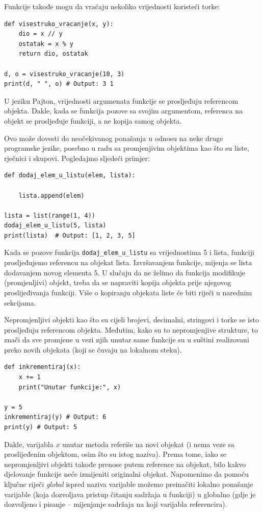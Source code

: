 Funkcije takođe mogu da vraćaju nekoliko vrijednosti koristeći torke:

\begin{verbatim}
def visestruko_vracanje(x, y):
    dio = x // y
    ostatak = x % y
    return dio, ostatak

d, o = visestruko_vracanje(10, 3)
print(d, " ", o) # Output: 3 1
\end{verbatim}


U jeziku Pajton, vrijednosti argumenata funkcije se prosljeđuju refere\-ncom objekta. Dakle, kada se funkcija pozove sa svojim argume\-ntom, referenca na objekt se prosljeđuje funkciji, a ne kopija samog objekta. %

Ovo može dovesti do   neočekivanog ponašanja u odnosu na neke druge programske jezike, posebno u radu sa promjenjivim objektima kao što su liste, rječnici i skupovi. Pogledajmo sljedeći primjer:

\begin{verbatim}
def dodaj_elem_u_listu(elem, lista):

    lista.append(elem)

lista = list(range(1, 4))
dodaj_elem_u_listu(5, lista)
print(lista)  # Output: [1, 2, 3, 5]
  \end{verbatim}

Kada se pozove funkcija \texttt{dodaj\_elem\_u\_listu} sa vrijednostima 5 i lista, funkciji prosljeđujemo referencu na objekat lista. Izvršavanjem funkcije, mijenja  se lista dodavanjem novog elementa 5.  U slučaju da ne želimo da funkcija modifikuje (promjenljivi) objekt, treba da se napraviti kopija objekta prije njegovog proslijeđivanja funkciji. Više o kopiranju objekata liste će biti riječi u narednim sekcijama.


Nepromjenljivi objekti kao što su cijeli brojevi, decimalni, stringovi i torke se isto prosljeđuju referencom objekta. Međutim, kako su to nepromjenjive strukture, to znači da sve promjene  u vezi njih unutar same funkcije su u suštini realizovani preko novih objekata (koji se čuvaju na lokalnom steku).

\begin{verbatim}
def inkrementiraj(x):
    x += 1
    print("Unutar funkcije:", x)

y = 5
inkrementiraj(y) # Output: 6
print(y) # Output: 5
  \end{verbatim}
Dakle, varijabla $x$ unutar metoda referiše na novi objekat (i nema veze sa proslijeđenim objektom, osim što su istog naziva). Prema tome, iako se nepromjenljivi objekti takođe prenose  putem reference na objekat, bilo kakvo djelovanje funkcije  neće izmijeniti originalni objekat.  Napomenimo da pomoću ključne riječi \textit{global} ispred naziva varijable možemo preinačiti lokalno ponašanje varijable (koja dozvoljava pristup čitanju sadržaja u funkciji) u globalno (gdje je dozvoljeno i pisanje -- mijenjanje sadržaja na koji varijabla referencira).  


